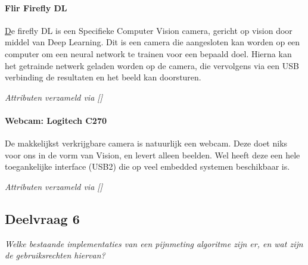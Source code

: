 \documentclass[11pt]{article}
\begin{document}
    \paragraph{Flir Firefly DL}
    \href{https://www.flir.com/products/firefly-dl/}
    De firefly DL is een Specifieke Computer Vision camera, gericht op vision door middel van Deep Learning.
    Dit is een camera die aangesloten kan worden op een computer om een neural network te trainen voor een bepaald doel.
    Hierna kan het getrainde netwerk geladen worden op de camera, die vervolgens via een USB verbinding de resultaten en het beeld kan doorsturen.


    \emph{Attributen verzameld via []}

    \paragraph{Webcam: Logitech C270}
    De makkelijkst verkrijgbare camera is natuurlijk een webcam. Deze doet niks voor ons in de vorm van Vision, en levert alleen beelden.
    Wel heeft deze een hele toegankelijke interface (USB2) die op veel embedded systemen beschikbaar is.

    \emph{Attributen verzameld via []}




    \subsection{Deelvraag 6}\label{subsec:deelvraag-6}
    \emph{Welke bestaande implementaties van een pijnmeting algoritme zijn er, en wat zijn de gebruiksrechten hiervan?}
\end{document}
